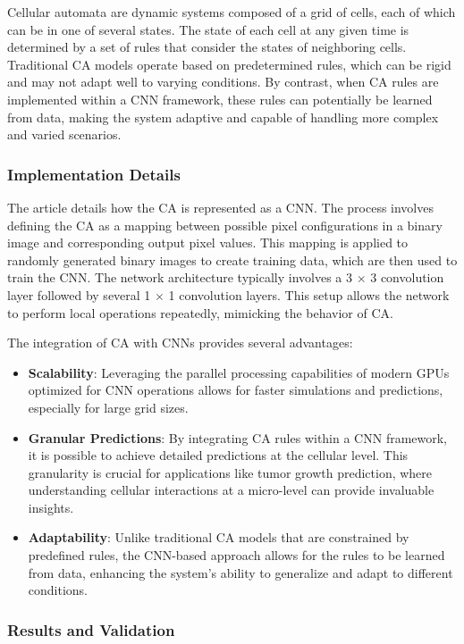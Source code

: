\documentclass[9pt,a4paper,twoside]{tau-class/tau}
\begin{document}
Cellular automata are dynamic systems composed of a grid of cells, each of which can be in one of several states. The state of each cell at any given time is determined by a set of rules that consider the states of neighboring cells. Traditional CA models operate based on predetermined rules, which can be rigid and may not adapt well to varying conditions. By contrast, when CA rules are implemented within a CNN framework, these rules can potentially be learned from data, making the system adaptive and capable of handling more complex and varied scenarios.

\subsubsection{Implementation Details}

The article details how the CA is represented as a CNN. The process involves defining the CA as a mapping between possible pixel configurations in a binary image and corresponding output pixel values. This mapping is applied to randomly generated binary images to create training data, which are then used to train the CNN. The network architecture typically involves a 3 $×$ 3 convolution layer followed by several 1 $×$ 1 convolution layers. This setup allows the network to perform local operations repeatedly, mimicking the behavior of CA.

The integration of CA with CNNs provides several advantages:

\begin{itemize}
    \item \textbf{Scalability}: Leveraging the parallel processing capabilities of modern GPUs optimized for CNN operations allows for faster simulations and predictions, especially for large grid sizes.
    \item \textbf{Granular Predictions}: By integrating CA rules within a CNN framework, it is possible to achieve detailed predictions at the cellular level. This granularity is crucial for applications like tumor growth prediction, where understanding cellular interactions at a micro-level can provide invaluable insights.
    \item \textbf{Adaptability}: Unlike traditional CA models that are constrained by predefined rules, the CNN-based approach allows for the rules to be learned from data, enhancing the system's ability to generalize and adapt to different conditions.
\end{itemize}

\subsubsection{Results and Validation}
\end{document}
